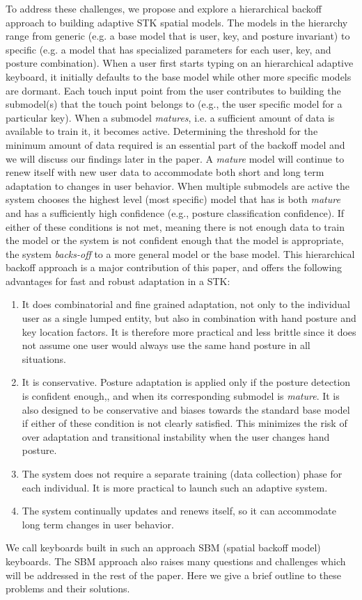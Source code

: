 \documentclass{sigchi}
\begin{document}
To address these challenges, we propose and explore a hierarchical backoff approach to building adaptive STK spatial models. The models in the hierarchy range from generic (e.g. a base model that is user, key, and posture invariant) to specific (e.g. a model that has specialized parameters for each user, key, and posture combination). When a user first starts typing on an hierarchical adaptive keyboard, it initially defaults to the base model while other more specific models are dormant. Each touch input point from the user contributes to building the submodel(s) that the touch point belongs to (e.g., the user specific model for a particular key). When a submodel \textit{matures}, i.e. a sufficient amount of data is available to train it, it becomes active. Determining the threshold for the minimum amount of data required is an essential part of the backoff model and we will discuss our findings later in the paper.
A \textit{mature} model will continue to renew itself with new user data to accommodate  both short and long term adaptation to changes in user behavior. When multiple submodels are active the system chooses the highest level (most specific) model that has is both \textit{mature} and has a sufficiently high confidence (e.g., posture classification confidence). If either of these conditions is not met, meaning there is not enough data to train the model or the system is not confident enough that the model is appropriate, the system \textit{backs-off} to a more general model or the base model. This hierarchical backoff approach is a major contribution of this paper, and offers the following advantages for fast and robust adaptation in a STK:
\begin{enumerate}
\item It does combinatorial and fine grained adaptation, not only to the individual user as a single lumped entity, but also in combination with hand posture and key location factors. It is therefore more practical and less brittle since it does not assume one user would always use the same hand posture in all situations.

\item It is conservative. Posture adaptation is applied only if the posture detection is confident enough,, and when its corresponding submodel is \textit{mature}. It is also designed to be conservative and biases towards the standard base model if either of these condition is not clearly satisfied. This minimizes the risk of over adaptation and transitional instability when the user changes hand posture. 
 
\item The system does not require a separate training (data collection) phase for each individual. It is more practical to launch such an adaptive system.

\item The system continually updates and renews itself, so it can accommodate
long term changes in user behavior.
\end{enumerate}
We call keyboards built in such an approach SBM (spatial backoff model) keyboards. The SBM approach also raises many questions and challenges which will be addressed in the rest of the paper. Here we give a brief outline to these problems and their solutions.
\end{document}
